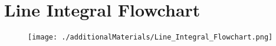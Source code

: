 \section{Line Integral Flowchart}

\begin{figure}[H]
	\centering
	\hspace*{-1.5in}
	\texttt{[image: ./additionalMaterials/Line\_Integral\_Flowchart.png]}
\end{figure}

\pagebreak